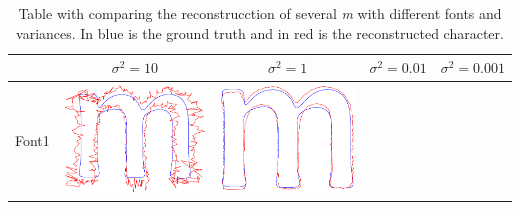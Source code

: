 \documentclass[12pt]{article}
\begin{document}
\begin{center}
\begin{table}[h]
\caption[Table caption text]{Table with comparing the reconstrucction of several \emph{m} with different fonts and variances. In blue is the ground truth and in red is the reconstructed character.}
\label{tab:results}
\begin{tabular}{|c|c|c|c|c|}
\hline
 & $\sigma^2=10$ & $\sigma^2=1$ & $\sigma^2=0.01$ & $\sigma^2=0.001$ \\ \hline
 Font1 & 
\includegraphics[scale = 0.2]{images/f1var10} &
\includegraphics[scale = 0.2]{images/f1var1} &

\end{tabular}
\end{table}
\end{center}
\end{document}
